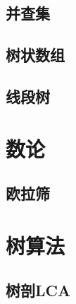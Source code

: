 \documentclass{article}
\begin{document}
\begin{multicols*}{2}
\subsection{并查集}

\subsection{树状数组}

\subsection{线段树}

\section{数论}
\subsection{欧拉筛}

\section{树算法}
\subsection{树剖LCA}

\end{multicols*}
\end{document}
